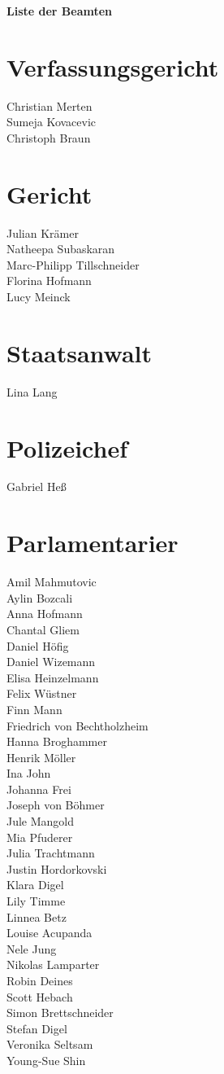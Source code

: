 \documentclass[12pt, twocolumn]{article}
\begin{document}
\textbf{\LARGE{Liste der Beamten}}

\section*{Verfassungsgericht}

Christian Merten\\
Sumeja Kovacevic\\
Christoph Braun

\section*{Gericht}
Julian Krämer\\
Natheepa Subaskaran\\
Marc-Philipp Tillschneider\\
Florina Hofmann\\
Lucy Meinck

\section*{Staatsanwalt}
Lina Lang

\section*{Polizeichef}
Gabriel Heß

\section*{Parlamentarier}
Amil Mahmutovic\\
Aylin Bozcali\\
Anna Hofmann\\
Chantal Gliem\\
Daniel Höfig\\
Daniel Wizemann\\
Elisa Heinzelmann\\
Felix Wüstner\\
Finn Mann\\
Friedrich von Bechtholzheim\\
Hanna Broghammer\\
Henrik Möller\\
Ina John\\
Johanna Frei\\
Joseph von Böhmer\\
Jule Mangold\\
Mia Pfuderer\\
Julia Trachtmann\\
Justin Hordorkovski\\
Klara Digel\\
Lily Timme\\
Linnea Betz\\
Louise Acupanda\\
Nele Jung\\
Nikolas Lamparter\\
Robin Deines\\
Scott Hebach\\
Simon Brettschneider\\
Stefan Digel\\
Veronika Seltsam\\
Young-Sue Shin
\end{document}
